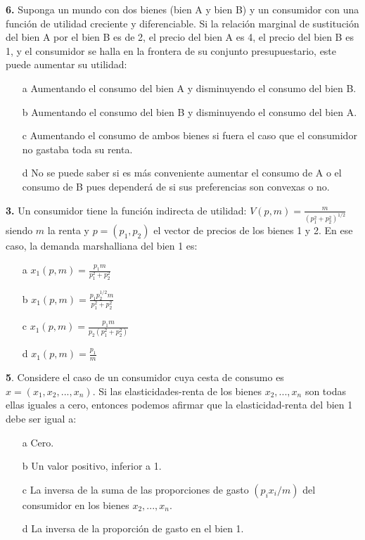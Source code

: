 \documentclass{nuevotema}
\begin{document}

\textbf{6.} Suponga un mundo con dos bienes (bien A y bien B) y un consumidor con una función de utilidad creciente y diferenciable. Si la relación marginal de sustitución del bien A por el bien B es de 2, el precio del bien A es 4, el precio del bien B es 1, y el consumidor se halla en la frontera de su conjunto presupuestario, este puede aumentar su utilidad:
\begin{enumerate}
    \item[a] Aumentando el consumo del bien A y disminuyendo el consumo del bien B.
    \item[b] Aumentando el consumo del bien B y disminuyendo el consumo del bien A.
    \item[c] Aumentando el consumo de ambos bienes si fuera el caso que el consumidor no gastaba toda su renta.
    \item[d] No se puede saber si es más conveniente aumentar el consumo de A o el consumo de B pues dependerá de si sus preferencias son convexas o no.
\end{enumerate}


\textbf{3.} Un consumidor tiene la función indirecta de utilidad:  $V(p, m) = \frac{m}{ (p_1^2 + p_2^2)^{ 1/2 }  }$ siendo $m$ la renta y $p=(p_1, p_2)$ el vector de precios de los bienes 1 y 2. En ese caso, la demanda marshalliana del bien 1 es:
\begin{enumerate}
    \item[a] $x_1 (p,m) = \frac{p_1 m}{p_1^2 + p_2^2}$
    \item[b] $x_1 (p,m) = \frac{p_1 p_2^{1/2} m }{p_1^2 + p_2^2}$
    \item[c] $x_1 (p,m) = \frac{p_1 m}{p_2 (p_1^2 + p_2^2)}$
    \item[d] $x_1 (p,m) = \frac{p_1}{m}$
\end{enumerate}


\textbf{5}. Considere el caso de un consumidor cuya cesta de consumo es $x=(x_1, x_2, ..., x_n)$. Si las elasticidades-renta de los bienes $x_2, ..., x_n$ son todas ellas iguales a cero, entonces podemos afirmar que la elasticidad-renta del bien 1 debe ser igual a:

\begin{enumerate}
    \item[a] Cero.
    \item[b] Un valor positivo, inferior a 1.
    \item[c] La inversa de la suma de las proporciones de gasto $(p_i x_i / m)$ del consumidor en los bienes $x_2, ..., x_n$.
    \item[d] La inversa de la proporción de gasto en el bien 1.
\end{enumerate}
\end{document}
